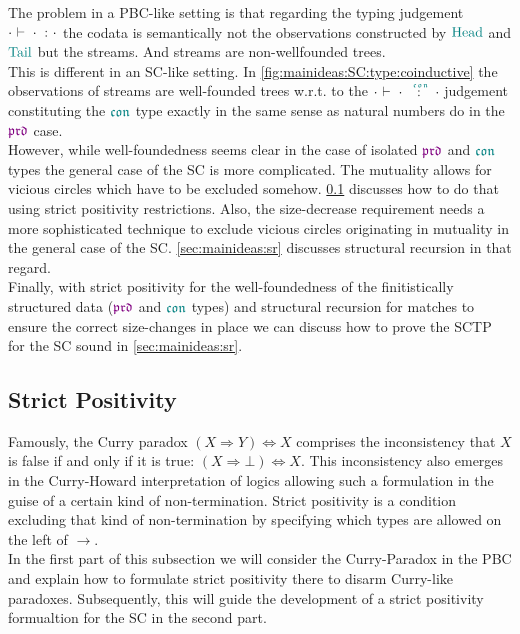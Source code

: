 The problem in a PBC-like setting is that regarding the typing judgement $\typetmpbc{\cdot}{\cdot}{\cdot}$ the codata is semantically not the observations constructed by $\Head$ and $\Tail$ but the streams.
And streams are non-wellfounded trees.
\\
This is different in an SC-like setting.
In \cref{fig:mainideas:SC:type:coinductive} the observations of streams are well-founded trees w.r.t. to the $\typetmcon{\cdot}{\cdot}{\cdot}$ judgement constituting the $\polcon$ type exactly in the same sense as natural numbers do in the $\polprd$ case.
\\
However, while well-foundedness seems clear in the case of isolated $\polprd$ and $\polcon$ types the general case of the SC is more complicated.
The mutuality allows for vicious circles which have to be excluded somehow.
\cref{sec:mainideas:sp} discusses how to do that using strict positivity restrictions.
Also, the size-decrease requirement needs a more sophisticated technique to exclude vicious circles originating in mutuality in the general case of the SC.
\cref{sec:mainideas:sr} discusses structural recursion in that regard.
\\
Finally, with strict positivity for the well-foundedness of the finitistically structured data ($\polprd$ and $\polcon$ types) and structural recursion for matches to ensure the correct size-changes in place we can discuss how to prove the SCTP for the SC sound in \cref{sec:mainideas:sr}.

\subsection{Strict Positivity}
\label{sec:mainideas:sp}

Famously, the Curry paradox $(X \Rightarrow Y) \Leftrightarrow X$ comprises the inconsistency that $X$ is false if and only if it is true: $(X \Rightarrow \bot) \Leftrightarrow X$.
This inconsistency also emerges in the Curry-Howard interpretation of logics allowing such a formulation in the guise of a certain kind of non-termination.
Strict positivity is a condition excluding that kind of non-termination by specifying which types are allowed on the left of $\rightarrow$.
\\
In the first part of this subsection we will consider the Curry-Paradox in the PBC and explain how to formulate strict positivity there to disarm Curry-like paradoxes.
Subsequently, this will guide the development of a strict positivity formualtion for the SC in the second part.

